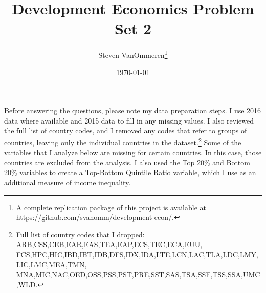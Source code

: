 \documentclass[12pt]{article}
\begin{document}
\title{Development Economics Problem Set 2}
\author{Steven VanOmmeren\thanks{A complete replication package of this project is available at \url{https://github.com/svanomm/development-econ/}.}}
\date{\today}
\maketitle

\doublespacing
\noindent
Before answering the questions, please note my data preparation steps. I use 2016 data where available and 2015 data to fill in any missing values. I also reviewed the full list of country codes, and I removed any codes that refer to groups of countries, leaving only the individual countries in the dataset.\footnote{Full list of country codes that I dropped: ARB,CSS,CEB,EAR,EAS,TEA,EAP,ECS,TEC,ECA,EUU,\\ FCS,HPC,HIC,IBD,IBT,IDB,DFS,IDX,IDA,LTE,LCN,LAC,TLA,LDC,LMY,LIC,LMC,MEA,TMN,\\ MNA,MIC,NAC,OED,OSS,PSS,PST,PRE,SST,SAS,TSA,SSF,TSS,SSA,UMC,WLD.} Some of the variables that I analyze below are missing for certain countries. In this case, those countries are excluded from the analysis. I also used the Top 20\% and Bottom 20\% variables to create a Top-Bottom Quintile Ratio variable, which I use as an additional measure of income inequality.
\end{document}
